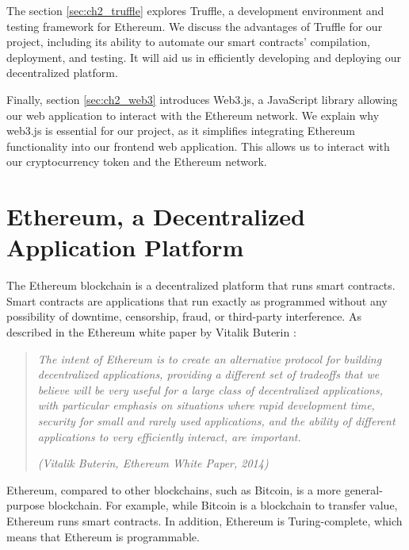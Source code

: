 The section \ref{sec:ch2_truffle} explores Truffle, a development environment and testing framework for Ethereum. We discuss the advantages of Truffle
for our project, including its ability to automate our smart contracts' compilation, deployment, and testing. It will aid us in efficiently developing
and deploying our decentralized platform.

Finally, section \ref{sec:ch2_web3} introduces Web3.js, a JavaScript library allowing our web application to interact with the Ethereum network.
We explain why web3.js is essential for our project, as it simplifies integrating Ethereum functionality into our frontend web application.
This allows us to interact with our cryptocurrency token and the Ethereum network.


\section{Ethereum, a Decentralized Application Platform}
\label{sec:ch2_ethereum}

The Ethereum blockchain is a decentralized platform that runs smart contracts. Smart contracts are applications that run exactly as programmed
without any possibility of downtime, censorship, fraud, or third-party interference. As described in the Ethereum white paper by Vitalik Buterin \cite{ethereum_white_paper}:
\begin{quote}
    \textit{The intent of Ethereum is to create an alternative protocol for building decentralized applications, providing a different set of tradeoffs that we
        believe will be very useful for a large class of decentralized applications, with particular emphasis on situations where rapid development time,
        security for small and rarely used applications, and the ability of different applications to very efficiently interact, are important.}


    \textit{(Vitalik Buterin, Ethereum White Paper, 2014)}
\end{quote}


Ethereum, compared to other blockchains, such as Bitcoin, is a more general-purpose blockchain. For example, while Bitcoin is a blockchain to transfer
value, Ethereum runs smart contracts. In addition, Ethereum is Turing-complete, which means that Ethereum is programmable.




